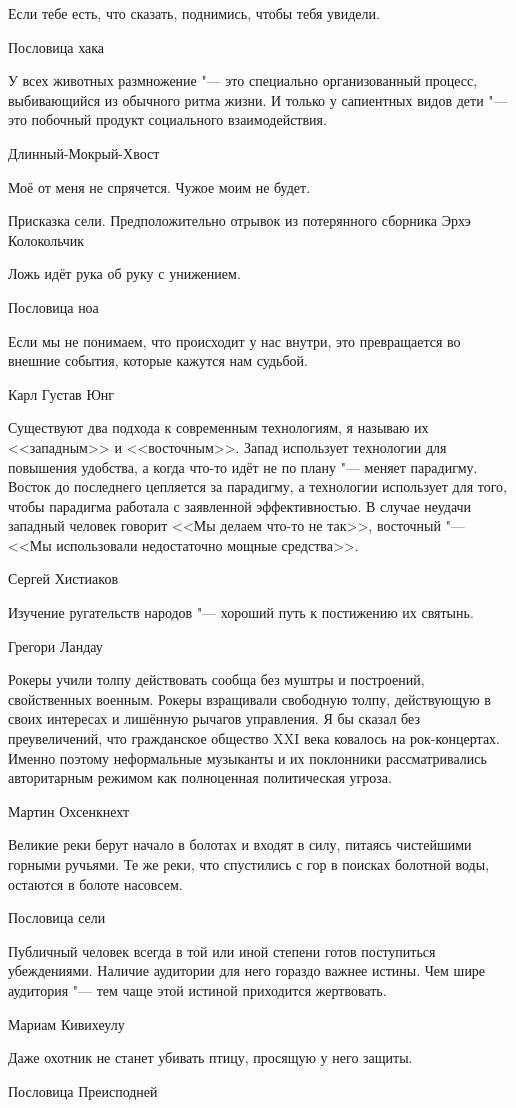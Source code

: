 \epigraph
{Если тебе есть, что сказать, поднимись, чтобы тебя увидели.}
{Пословица хака}

\epigraph
{У всех животных размножение "--- это специально организованный процесс, выбивающийся из обычного ритма жизни.
И только у сапиентных видов дети "--- это побочный продукт социального взаимодействия.}
{Длинный-Мокрый-Хвост}

\epigraph
{Моё от меня не спрячется.
Чужое моим не будет.}
{Присказка сели.
Предположительно отрывок из потерянного сборника Эрхэ Колокольчик}

\epigraph
{Ложь идёт рука об руку с унижением.}
{Пословица ноа}

\epigraph
{Если мы не понимаем, что происходит у нас внутри, это превращается во внешние события, которые кажутся нам судьбой.}
{Карл Густав Юнг}

\epigraph
{Существуют два подхода к современным технологиям, я называю их <<западным>> и <<восточным>>.
Запад использует технологии для повышения удобства, а когда что-то идёт не по плану "--- меняет парадигму.
Восток до последнего цепляется за парадигму, а технологии использует для того, чтобы парадигма работала с заявленной эффективностью.
В случае неудачи западный человек говорит <<Мы делаем что-то не так>>, восточный "--- <<Мы использовали недостаточно мощные средства>>.}
{Сергей Хистиаков}

\epigraph{Изучение ругательств народов "--- хороший путь к постижению их святынь.}
{Грегори Ландау}

\epigraph
{Рокеры учили толпу действовать сообща без муштры и построений, свойственных военным.
Рокеры взращивали свободную толпу, действующую в своих интересах и лишённую рычагов управления.
Я бы сказал без преувеличений, что гражданское общество XXI века ковалось на рок-концертах.
Именно поэтому неформальные музыканты и их поклонники рассматривались авторитарным режимом как полноценная политическая угроза.}
{Мартин Охсенкнехт}

\epigraph
{Великие реки берут начало в болотах и входят в силу, питаясь чистейшими горными ручьями.
Те же реки, что спустились с гор в поисках болотной воды, остаются в болоте насовсем.}
{Пословица сели}

\epigraph
{Публичный человек всегда в той или иной степени готов поступиться убеждениями.
Наличие аудитории для него гораздо важнее истины.
Чем шире аудитория "--- тем чаще этой истиной приходится жертвовать.}
{Мариам Кивихеулу}

\epigraph
{Даже охотник не станет убивать птицу, просящую у него защиты.}
{Пословица Преисподней}

